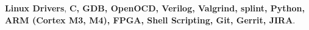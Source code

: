 
\reversemarginpar {}
\noindent \textbf{Linux Drivers}, \textbf{C, GDB, OpenOCD, Verilog, Valgrind, splint, Python, ARM (Cortex M3, M4), FPGA, Shell Scripting, Git, Gerrit, JIRA}.
\\